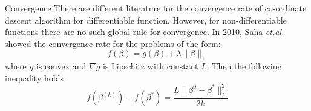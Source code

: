 \documentclass[tikz]{beamer}					%
\begin{document}
{
\begin{frame}{Convergence}
There are different literature for the convergence rate of co-ordinate descent algorithm
for differentiable function. However, for non-differentiable functions there are no such
global rule for convergence. In 2010, Saha \textit{et.al.} showed the convergence rate for 
the problems of the form:
\begin{equation}
    f(\beta) = g(\beta) + \lambda\|\beta\|_1
\end{equation}
where $g$ is convex and $\nabla g$ is Lipschitz with constant $L$. Then the following
inequality holds
\begin{equation}
    f(\beta^{(k)}) - f(\beta^*) = \frac{L\|\beta^0-\beta^*\|_2^2}{2k}
\end{equation}
\end{frame}
}
\end{document}

